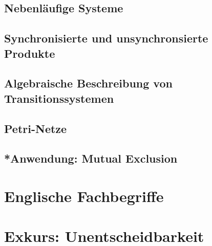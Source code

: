 \documentclass[11pt, a4paper]{article}
\theoremstyle{definition}
\theoremstyle{plain}
\numberwithin{equation}{section}
\begin{document}
\subsection{Nebenläufige Systeme}


\subsection{Synchronisierte und unsynchronsierte Produkte}


\subsection{Algebraische Beschreibung von Transitionssystemen}


\subsection{Petri-Netze}


\subsection{*Anwendung: Mutual Exclusion}



\newpage
{}
\nocite{*}




\newpage
\begin{appendix}
\section{Englische Fachbegriffe}


\newpage
\section{Exkurs: Unentscheidbarkeit}
\end{appendix}

\end{document}
